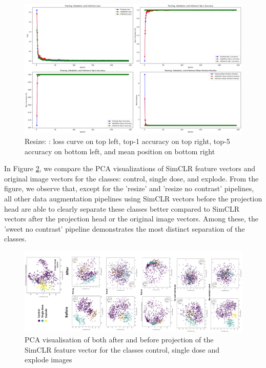 \begin{figure}[H]
  \centering
  \includegraphics[scale=0.3]{figures/Resize.png} 
  \caption{Resize: : loss curve on top left, top-1 accuracy on top right, top-5 accuracy on bottom left, and mean position on bottom right}
  \label{fig:Resize_b64}
\end{figure}

In Figure \ref{fig:pca_viz}, we compare the PCA visualizations of SimCLR feature vectors and original image vectors for the classes: control, single dose, and explode. From the figure, we observe that, except for the 'resize' and 'resize no contrast' pipelines, all other data augmentation pipelines using SimCLR vectors before the projection head are able to clearly separate these classes better compared to SimCLR vectors after the projection head or the original image vectors. Among these, the 'sweet no contrast' pipeline demonstrates the most distinct separation of the classes.
\begin{figure}[H]
  \centering
  \includegraphics[scale=0.5, angle=-90]{figures/pca_viz.png} 
  \caption{PCA visualisation of both after and before projection of the SimCLR feature vector for the classes control, single dose and explode images}
  \label{fig:pca_viz}
\end{figure}
